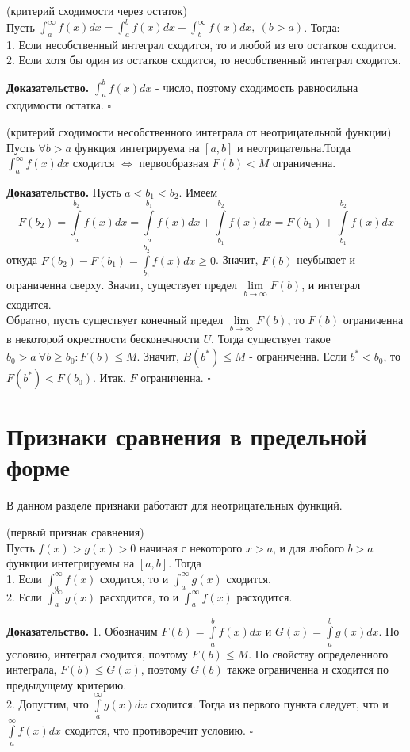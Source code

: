\begin{theor} (критерий сходимости через остаток)\\
Пусть $\int^\infty_af(x)dx=\int^b_af(x)dx+\int^\infty_bf(x)dx,~(b>a)$. 
Тогда:\\
1. Если несобственный интеграл сходится, то и любой из его остатков сходится.\\
2. Если хотя бы один из остатков сходится, то несобственный интеграл сходится.
\end{theor}
\textbf{Доказательство.} $\int^b_af(x)dx$ - число, поэтому сходимость 
равносильна сходимости остатка. $\square$ 

\begin{theor} (критерий сходимости несобственного интеграла от неотрицательной
функции)\\
Пусть $\forall b>a$ функция интегрируема на $[a,b]$ и неотрицательна.Тогда
$\int^\infty_af(x)dx$ сходится $\Leftrightarrow$ первообразная $F(b)<M$ 
ограниченна.
\end{theor}
\textbf{Доказательство.} Пусть $a<b_1<b_2$. Имеем
$$F(b_2)=\int\limits_{a}^{b_2}f(x)dx=\int\limits_{a}^{b_1}f(x)dx+
\int\limits_{b_1}^{b_2}f(x)dx=F(b_1)+\int\limits_{b_1}^{b_2}f(x)dx$$
откуда $F(b_2)-F(b_1)=\int\limits_{b_1}^{b_2}f(x)dx\geqslant 0$. Значит,
$F(b)$ неубывает и ограниченна сверху. Значит, существует предел
$\lim\limits_{b \to \infty}F(b)$, и интеграл сходится.\\
Обратно, пусть существует конечный предел $\lim\limits_{b \to \infty} F(b)$,
то $F(b)$ ограниченна в некоторой окрестности бесконечности $U$.
Тогда существует такое $b_0>a~\forall b\geqslant b_0:F(b)\leqslant M$.
Значит, $B(b^*)\leqslant M$ - ограниченна. Если $b^*<b_0$, то
$F(b^*)<F(b_0)$. Итак, $F$ ограниченна. $\square$

\section{Признаки сравнения в предельной форме}
В данном разделе признаки работают для неотрицательных функций.
\begin{theor} (первый признак сравнения)\\
Пусть $f(x)>g(x)>0$ начиная с некоторого $x>a$, и для любого  $b>a$
функции интегрируемы на $[a,b]$. Тогда\\
1. Если  $\int^\infty_a f(x)$ сходится, то и  $\int^\infty_a g(x)$ сходится.\\
2. Если  $\int^\infty_a g(x)$ расходится, то и $\int^\infty_a f(x)$ расходится.
\end{theor}
\textbf{Доказательство.} 1. Обозначим $F(b)=\int\limits_{a}^{b}f(x)dx$ и
$G(x)=\int\limits_{a}^{b}g(x)dx$. По условию, интеграл сходится, поэтому
$F(b)\leqslant M$. По свойству определенного интеграла, $F(b)\leqslant G(x)$,
поэтому $G(b)$ также ограниченна и сходится по предыдущему критерию.\\
2. Допустим, что $\int\limits_{a}^{\infty}g(x)dx$ сходится. Тогда из 
первого пункта следует, что и $\int\limits_{a}^{\infty}f(x)dx$ сходится, 
что противоречит условию. $\square$ 

